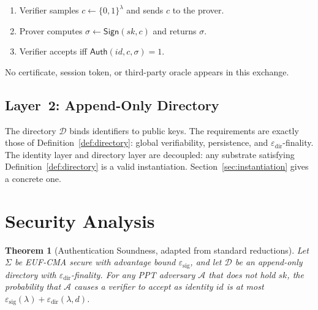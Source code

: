 \documentclass[11pt,a4paper]{article}
\newtheorem{theorem}{Theorem}[section]
\begin{document}
\begin{enumerate}[leftmargin=*]
  \item Verifier samples $c \gets \{0,1\}^\lambda$ and sends $c$ to the prover.
  \item Prover computes $\sigma \gets \mathsf{Sign}(sk, c)$ and returns $\sigma$.
  \item Verifier accepts iff $\mathsf{Auth}(id, c, \sigma) = 1$.
\end{enumerate}

No certificate, session token, or third-party oracle appears in this
exchange.

\subsection{Layer~2: Append-Only Directory}

The directory $\mathcal{D}$ binds identifiers to public keys.  The
requirements are exactly those of Definition~\ref{def:directory}: global verifiability,
persistence, and $\varepsilon_{\mathrm{dir}}$-finality.  The identity layer
and directory layer are decoupled: any substrate satisfying Definition~\ref{def:directory} is a
valid instantiation.  Section~\ref{sec:instantiation} gives a concrete one.

\section{Security Analysis}
\label{sec:security}

\begin{theorem}[Authentication Soundness, adapted from standard reductions]
  \label{thm:soundness}
  Let $\Sigma$ be EUF-CMA secure with advantage bound $\varepsilon_{\mathrm{sig}}$,
  and let $\mathcal{D}$ be an append-only directory with
  $\varepsilon_{\mathrm{dir}}$-finality.  For any PPT adversary $\mathcal{A}$
  that does not hold $sk$, the probability that $\mathcal{A}$ causes a
  verifier to accept as identity $id$ is at most
  $\varepsilon_{\mathrm{sig}}(\lambda) + \varepsilon_{\mathrm{dir}}(\lambda, d)$.
\end{theorem}
\end{document}
